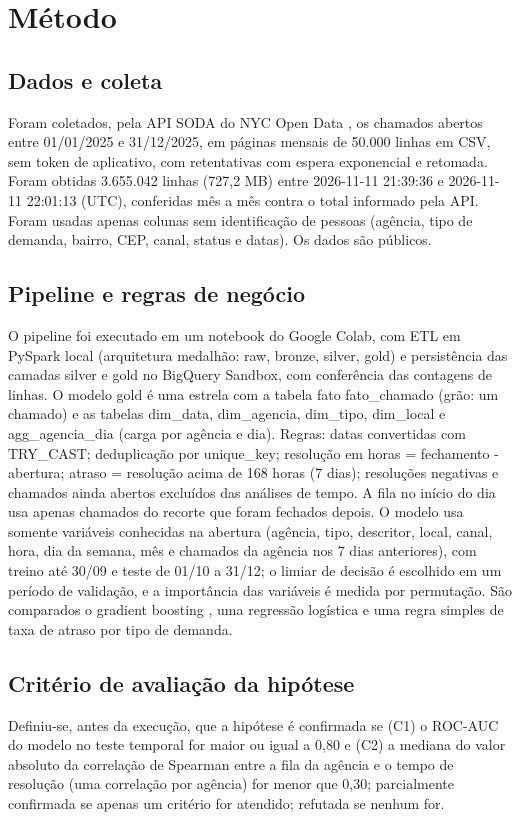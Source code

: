 \documentclass[11pt,a4paper]{article}
\begin{document}
\section{Método}
\subsection{Dados e coleta}
Foram coletados, pela API SODA do NYC Open Data \cite{nyc311}, os chamados abertos entre 01/01/2025 e 31/12/2025, em páginas mensais de 50.000 linhas em CSV, sem token de aplicativo, com retentativas com espera exponencial e retomada. Foram obtidas 3.655.042 linhas (727,2 MB) entre 2026-11-11 21:39:36 e 2026-11-11 22:01:13 (UTC), conferidas mês a mês contra o total informado pela API. Foram usadas apenas colunas sem identificação de pessoas (agência, tipo de demanda, bairro, CEP, canal, status e datas). Os dados são públicos.

\subsection{Pipeline e regras de negócio}
O pipeline foi executado em um notebook do Google Colab, com ETL em PySpark local (arquitetura medalhão: raw, bronze, silver, gold) e persistência das camadas silver e gold no BigQuery Sandbox, com conferência das contagens de linhas. O modelo gold é uma estrela com a tabela fato fato\_chamado (grão: um chamado) e as tabelas dim\_data, dim\_agencia, dim\_tipo, dim\_local e agg\_agencia\_dia (carga por agência e dia). Regras: datas convertidas com TRY\_CAST; deduplicação por unique\_key; resolução em horas = fechamento - abertura; atraso = resolução acima de 168 horas (7 dias); resoluções negativas e chamados ainda abertos excluídos das análises de tempo. A fila no início do dia usa apenas chamados do recorte que foram fechados depois. O modelo usa somente variáveis conhecidas na abertura (agência, tipo, descritor, local, canal, hora, dia da semana, mês e chamados da agência nos 7 dias anteriores), com treino até 30/09 e teste de 01/10 a 31/12; o limiar de decisão é escolhido em um período de validação, e a importância das variáveis é medida por permutação. São comparados o gradient boosting \cite{friedman}, uma regressão logística e uma regra simples de taxa de atraso por tipo de demanda.

\subsection{Critério de avaliação da hipótese}
Definiu-se, antes da execução, que a hipótese é confirmada se (C1) o ROC-AUC do modelo no teste temporal for maior ou igual a 0,80 e (C2) a mediana do valor absoluto da correlação de Spearman entre a fila da agência e o tempo de resolução (uma correlação por agência) for menor que 0,30; parcialmente confirmada se apenas um critério for atendido; refutada se nenhum for.
\end{document}
